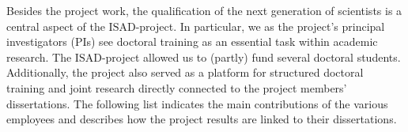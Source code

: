 \documentclass[11pt,a4paper]{article}
\def\PN{\mathrm{ISAD}}
\theoremstyle{plain} \newtheorem{define}{Definition}[section]
\begin{document}
%
%
%
%
%
%
%
%
%
%
%

Besides the project work, the qualification of the next generation of scientists is a central aspect of the $\PN$-project. In particular, we as the project's principal investigators (PIs) see doctoral training as an essential task within academic research. The $\PN$-project allowed us to (partly) fund several doctoral students. Additionally, the project also served as a platform for structured doctoral training and joint research directly connected to the project members' dissertations. The following list indicates the main contributions of the various employees and describes how the project results are linked to their dissertations. 
\end{document}
